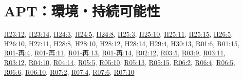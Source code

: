 \section{APT：環境・持続可能性}
\hyperref[q:h23-reg-apt-12]{H23:12}, \hyperref[q:h23-reg-apt-14]{H23:14}, \hyperref[q:h24-reg-apt-03]{H24:3}, \hyperref[q:h24-reg-apt-05]{H24:5}, \hyperref[q:h24-reg-apt-08]{H24:8}, \hyperref[q:h25-reg-apt-03]{H25:3}, \hyperref[q:h25-reg-apt-10]{H25:10}, \hyperref[q:h25-reg-apt-11]{H25:11}, \hyperref[q:h25-reg-apt-15]{H25:15}, \hyperref[q:h26-reg-apt-05]{H26:5}, \hyperref[q:h26-reg-apt-10]{H26:10}, \hyperref[q:h27-reg-apt-11]{H27:11}, \hyperref[q:h28-reg-apt-08]{H28:8}, \hyperref[q:h28-reg-apt-10]{H28:10}, \hyperref[q:h28-reg-apt-12]{H28:12}, \hyperref[q:h28-reg-apt-14]{H28:14}, \hyperref[q:h29-reg-apt-04]{H29:4}, \hyperref[q:h30-reg-apt-13]{H30:13}, \hyperref[q:r01-reg-apt-06]{R01:6}, \hyperref[q:r01-reg-apt-15]{R01:15}, \hyperref[q:r01-ret-apt-04]{R01-再:4}, \hyperref[q:r01-ret-apt-11]{R01-再:11}, \hyperref[q:r01-ret-apt-13]{R01-再:13}, \hyperref[q:r01-ret-apt-14]{R01-再:14}, \hyperref[q:r02-reg-apt-12]{R02:12}, \hyperref[q:r03-reg-apt-05]{R03:5}, \hyperref[q:r03-reg-apt-09]{R03:9}, \hyperref[q:r03-reg-apt-11]{R03:11}, \hyperref[q:r03-reg-apt-12]{R03:12}, \hyperref[q:r04-reg-apt-10]{R04:10}, \hyperref[q:r04-reg-apt-14]{R04:14}, \hyperref[q:r05-reg-apt-05]{R05:5}, \hyperref[q:r05-reg-apt-10]{R05:10}, \hyperref[q:r05-reg-apt-13]{R05:13}, \hyperref[q:r05-reg-apt-15]{R05:15}, \hyperref[q:r06-reg-apt-02]{R06:2}, \hyperref[q:r06-reg-apt-04]{R06:4}, \hyperref[q:r06-reg-apt-05]{R06:5}, \hyperref[q:r06-reg-apt-06]{R06:6}, \hyperref[q:r06-reg-apt-10]{R06:10}, \hyperref[q:r07-reg-apt-02]{R07:2}, \hyperref[q:r07-reg-apt-04]{R07:4}, \hyperref[q:r07-reg-apt-06]{R07:6}, \hyperref[q:r07-reg-apt-10]{R07:10}
